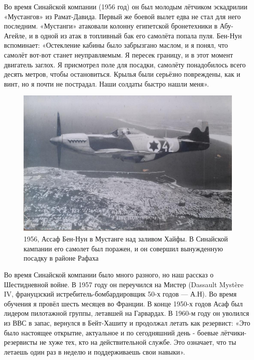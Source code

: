 Во время Синайской компании (1956 год) он был молодым лётчиком эскадрилии «Мустангов» из Рамат-Давида. Первый же боевой вылет едва не стал для него последним. «Мустанги» атаковали колонну египетской бронетехники в Абу-Агейле, и в одной из атак в топливный бак его самолёта попала пуля. Бен-Нун вспоминает: «Остекление кабины было забрызгано маслом, и я понял, что самолёт вот-вот станет неуправляемым. Я пересек границу, и в этот момент двигатель заглох. Я присмотрел поле для посадки, самолёту понадобилось всего десять метров, чтобы остановиться. Крылья были серьёзно повреждены, как и винт, но я почти не пострадал. Наши солдаты быстро нашли меня».

\begin{figure}[h!tb] 
	\centering\includegraphics[scale=0.5]{History_BenNun/eWF3hz6vz80.jpg}
	\caption{1956, Ассаф Бен-Нун в Мустанге над заливом Хайфы. В Синайской кампании его самолет был поражен, и он совершил вынужденную посадку в районе Рафаха}%
\end{figure}

Во время Синайской компании было много разного, но наш рассказ о Шестидневной войне. В 1957 году он переучился на Мистер (Dassault Mystère IV, франуцзский истребитель-бомбардировщик 50-х годов — А.Н). Во время обучения я провёл шесть месяцев во Франции. В конце 1950-х годов Асаф был лидером пилотажной группы, летавшей на Гарвардах. В 1960-м году он уволился из ВВС в запас, вернулся в Бейт-Хашиту и продолжал летать как резервист: «Это было настоящее открытие, актуальное и по сегодняшний день - боевые лётчики-резервисты не хуже тех, кто на действительной службе. Это означает, что ты летаешь один раз в неделю и поддерживаешь свои навыки».


